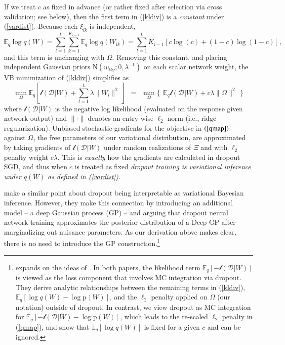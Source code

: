\documentclass[12pt]{article}
\newcommand{\mc}[1]{\mathcal{#1}}
\newcommand{\mr}[1]{\mathrm{#1}}
\newcommand{\ds}[1]{\mathds{#1}}
\begin{document}
If we treat $c$ as fixed in advance (or rather fixed after selection via cross validation; see below), then the first term in (\ref{kldiv}) is a {\it constant} under 
(\ref{vardist}).   Because each $\xi_{lk}$ is independent,
\begin{equation}\label{negent}
\ds{E}_q \log q(W) = 
\sum_{l = 1}^L \sum_{k = 1}^{K_{l-1}} \ds{E}_q \log q(W_{lk}) 
= \sum_{l = 1}^L K_{l-1} \left[c\log(c)
	+ (1-c)\log(1-c)\right],
\end{equation}
and this term is unchanging with $\Omega$.  
Removing this constant, and placing independent Gaussian priors $\mr{N}(w_{lkj}; 0, \lambda^{-1})$ on each scalar network weight, the VB minimization of (\ref{kldiv}) simplifies as 
\begin{equation}\label{qmap}
 \min_{\Omega} \ds{E}_q\left[ \mathscr{l}(\mc{D}|W) + \sum_{l = 1}^L \lambda\| W_l \|^2 ~\right]
 ~~=~~\min_{\Omega} \bigg\{~~\ds{E}_q \mathscr{l}(\mc{D}|W) +  c\lambda\| \Omega \|^2 ~~\bigg\}
 \end{equation}  
 where $\mathscr{l}(\mc{D}|W)$ is the negative log likelihood 
 (evaluated on the response given network output) and $\| \cdot \|$ denotes an entry-wise $\ell_2$ norm (i.e., ridge regularization).
Unbiased stochastic gradients for the objective in  $(\ref{qmap})$  against $\Omega$, the free parameters of our variational distribution, are approximated by taking gradients of $\mathscr{l}(\mc{D}|W)$ under  random realizations of $\Xi$ and with $\ell_2$ penalty weight $c\lambda$.  This is {\it exactly} how the gradients are calculated in dropout SGD, and thus when $c$ is treated as fixed {\it dropout training is variational inference under 
$q(W)$ as defined in (\ref{vardist}).}

\cite{gal2015dropout} make a similar point about dropout being interpretable as variational Bayesian inference.  However, they make this connection by introducing an additional model -- a  deep Gaussian process (GP) -- and arguing that dropout  neural network training approximates  the posterior distribution of a Deep GP after marginalizing out nuisance parameters. As our derivation above makes clear, there is no need to introduce the GP construction.\footnote{\cite{Gal2016Uncertainty} expands on the ideas of \cite{gal2015dropout}.   In both papers, the likelihood term $\ds{E}_q\left[ -\mathscr{l}(\mc{D}|W)\right]$ is viewed as the loss component that involves MC integration via dropout.  They derive  analytic relationships between the remaining terms in (\ref{kldiv}), $\ds{E}_q\left[\log q(W) - \log \mr{p}(W)\right]$, and the $\ell_2$ penalty applied on $\Omega$ (our notation) outside of dropout.  In contrast, we view dropout as MC integration for $\ds{E}_q\left[ -\mathscr{l}(\mc{D}|W) - \log \mr{p}(W)\right]$, which leads to the re-scaled $\ell_2$ penalty in (\ref{qmap}),  and show that $\ds{E}_q\left[\log q(W)\right]$ is fixed for a given $c$ and can be ignored.}
\end{document}
